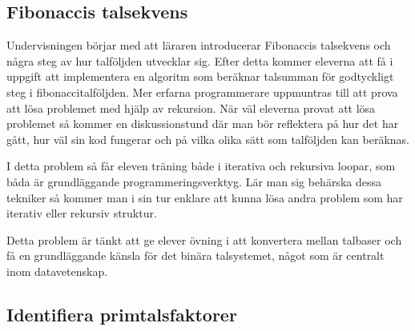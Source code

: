 \subsection{Fibonaccis talsekvens}
    \label{sec:Fibonacci}
    
    \textcolor{WildStrawberry}{
        Undervisningen börjar med att läraren introducerar Fibonaccis talsekvens och några steg av hur talföljden utvecklar sig. Efter detta kommer eleverna att få i uppgift att implementera en algoritm som beräknar talsumman för godtyckligt steg i fibonaccitalföljden. Mer erfarna programmerare uppmuntras till att prova att lösa problemet med hjälp av rekursion. När väl eleverna provat att lösa problemet så kommer en diskussionstund där man bör reflektera på hur det har gått, hur väl sin kod fungerar och på vilka olika sätt som talföljden kan beräknas.}
        
    \textcolor{WildStrawberry}{
        I detta problem så får eleven träning både i iterativa och rekursiva loopar, som båda är grundläggande programmeringsverktyg. Lär man sig behärska dessa tekniker så kommer man i sin tur enklare att kunna lösa andra problem som har iterativ eller rekursiv struktur.}


    
    \textcolor{WildStrawberry}{Detta problem är tänkt att ge elever övning i att konvertera mellan talbaser och få en grundläggande känsla för det binära talsystemet, något som är centralt inom datavetenskap.}
%    
    
\subsection{Identifiera primtalsfaktorer}
    \label{sec:primtal}
    
